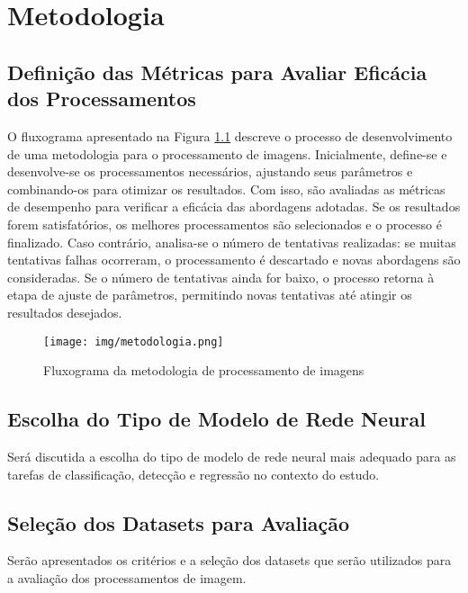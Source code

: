 \chapter{Metodologia}
\section{Definição das Métricas para Avaliar Eficácia dos Processamentos}

O fluxograma apresentado na Figura \ref{fig:fluxograma_metodologia} descreve o processo de desenvolvimento de uma metodologia para o processamento de imagens. Inicialmente, define-se e desenvolve-se os processamentos necessários, ajustando seus parâmetros e combinando-os para otimizar os resultados. Com isso, são avaliadas as métricas de desempenho para verificar a eficácia das abordagens adotadas. Se os resultados forem satisfatórios, os melhores processamentos são selecionados e o processo é finalizado. Caso contrário, analisa-se o número de tentativas realizadas: se muitas tentativas falhas ocorreram, o processamento é descartado e novas abordagens são consideradas. Se o número de tentativas ainda for baixo, o processo retorna à etapa de ajuste de parâmetros, permitindo novas tentativas até atingir os resultados desejados.

\begin{figure}[H]
    \label{fig:fluxograma_metodologia}
    \centering
    \caption{Fluxograma da metodologia de processamento de imagens}
    \texttt{[image: img/metodologia.png]}
\end{figure}

\section{Escolha do Tipo de Modelo de Rede Neural}
Será discutida a escolha do tipo de modelo de rede neural mais adequado para as tarefas de classificação, detecção e regressão no contexto do estudo.

\section{Seleção dos Datasets para Avaliação}
Serão apresentados os critérios e a seleção dos datasets que serão utilizados para a avaliação dos processamentos de imagem.

